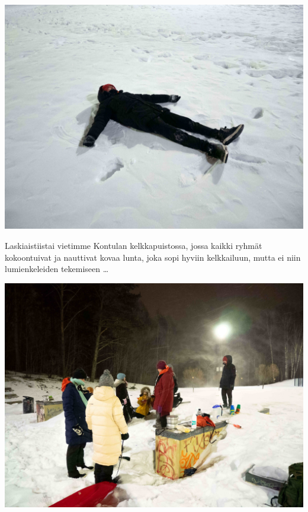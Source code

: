 \documentclass[10pt,finnish,a5paper,headings=small,twoside=semi]{scrartcl}
\begin{document}
\vspace*{1.28cm}
\begin{multicols}{2}

	\vspace*{0.16cm}
	\noindent\includegraphics[width=\linewidth]{assets/laskiaistiistai2}

	\small Laskiaistiistai vietimme Kontulan \mbox{kelkkapuistossa}, jossa kaikki
	ryhmät kokoontuivat ja nauttivat kovaa lunta, joka sopi hyviin kelkkailuun, mutta ei niin
	lumienkeleiden tekemiseen \ldots

	\vspace*{0.64cm}
	\noindent\includegraphics[width=\linewidth]{assets/laskiaistiistai1}


\end{multicols}
\end{document}
